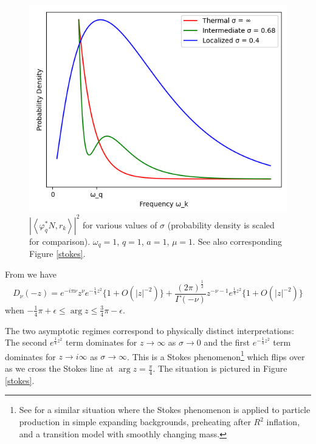 \documentclass[12pt,a4paper]{article}
\begin{document}
{\begin{figure}
\includegraphics[scale=0.5]{pcf.png}
\caption{$\left|\left< \varphi^*_q N, r_k \right>\right|^2$ for various values of $\sigma$ (probability density is scaled for comparison). $\omega_q = 1$, $q = 1$, $a=1$, $\mu = 1$. See also corresponding Figure \ref{stokes}.}
\label{pcf_sigma_curves}
\end{figure}
From \cite{Olver1959UniformAE} we have
\begin{equation}
  D_\nu(-z) = e^{-i\pi\nu}z^{\nu}e^{-\frac{1}{4}z^2} \{ 1 + O(|z|^{-2}) \} + \frac{(2 \pi)^{\frac{1}{2}}}{\Gamma(-\nu)} z^{-\nu - 1} e^{\frac{1}{4}z^2} \{1 + O(|z|^{-2})\}
\label{asym}
\end{equation}
when $-\frac{1}{4}\pi + \epsilon \le \arg z \le \frac{3}{4} \pi - \epsilon$.

The two asymptotic regimes correspond to physically distinct interpretations: The second $e^{\frac{1}{4}z^2}$ term dominates for $z \to \infty$ as $\sigma \to 0$ and the first  $e^{-\frac{1}{4}z^2}$ term dominates for $z \to i \infty$ as $\sigma \to \infty$.  This is a Stokes phenomenon\footnote{See \cite{hashiba2021stokes} for a similar situation where the Stokes phenomenon is applied to particle production in simple expanding backgrounds, preheating after $R^2$ inflation, and a transition model with smoothly changing mass.} which flips over as we cross the Stokes line at $\arg z = \frac{\pi}{4}$. The situation is pictured in Figure \ref{stokes}.


}
\end{document}
